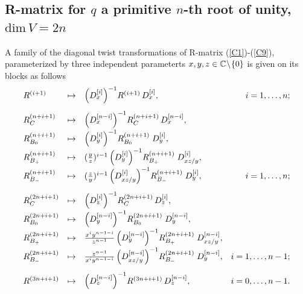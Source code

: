 \documentclass[11pt]{article}
\def\be{\begin{equation}}\def\ee{\end{equation}}
\begin{document}
 
\subsection{R-matrix for $q$ a primitive $n$-th root of unity, $\mbox{dim}\, V=2n$}

A family of the diagonal twist transformations of  R-matrix (\ref{C1})-(\ref{C9}), parameterized by three independent parameterts $x, y, z\in {\Bbb C}\!\setminus\! \{0\}$ is given on its blocks as follows
\be
\lb{twist-C}
\begin{array}{lclr}
	R^{(i+1)}&\mapsto& \left(D_x^{[i]}\right)^{-1}\! R^{(i+1)}\, D_x^{[i]},& i=1,\dots , n;
	\\[12pt]
	R_{C}^{(n+i+1)}&\mapsto&  \left(D_{x}^{[n-i]}\right)^{-1}\!  R_{C}^{(n+i+1)}\, D_{x}^{[n-i]}, & 
	\\[5pt]
	R_{B_0}^{(n+i+1)} & \mapsto&   \left(D_{y}^{[i]}\right)^{-1}\! R_{B_0}^{(n+i+1)}\; D_{y}^{[i]}, &
	\\[5pt]
	R_{B_+}^{(n+i+1)} &\mapsto &  {\textstyle ({y\over z})^{i-1}}\left(D_{y}^{[i]}\right)^{-1}\! 
	R_{B_+}^{(n+i+1)}\; D_{x z/y}^{[i]}, & 
	\\[5pt]
	R_{B_-}^{(n+i+1)} &\mapsto&  {\textstyle ({z\over y})^{i-1}}\left(D_{x z/ y}^{[i]}\right)^{-1}\! 
	R_{B_-}^{(n+i+1)}\; D_{y}^{[i]},
	&i=1,\dots , n;
	\\[12pt]
	R_{C}^{(2n+i+1)}&\mapsto& \left(D_{z}^{[i]}\right)^{-1}\! R_{C}^{(2n+i+1)}\, D_{z}^{[i]}, & 
	\\[5pt]
	R_{B_0}^{(2n+i+1)} &\mapsto&  \left(D_{y}^{[n-i]}\right)^{-1}\! R_{B_0}^{(2n+i+1)}\; D_{y}^{[n-i]}, &
	\\[5pt]
	R_{B_+}^{(2n+i+1)} &\mapsto & {\textstyle {x^{i}y^{n-1-i}\over z^{n-1}}}  \left(D_{y}^{[n-i]}\right)^{-1}\! 
	R_{B_+}^{(2n+i+1)}\; D_{x z/y}^{[n-i]}, &
	\\[5pt]
	R_{B_-}^{(2n+i+1)} &\mapsto& {\textstyle {z^{n-1}\over x^{i}y^{n-1-i}}}  \left(D_{x z/ y}^{[n-i]}\right)^{-1}\! 
	R_{B_-}^{(2n+i+1)}\; D_{y}^{[n-i]},&i=1,\dots , n-1;
	\\[12pt]
	R^{(3n+i+1)}&\mapsto& \left(D_{z}^{[n-i]}\right)^{-1}\! R^{(3n+i+1)}\, D_{z}^{[n-i]},& i=0,\dots , n-1.
\end{array}
\ee
\end{document}

